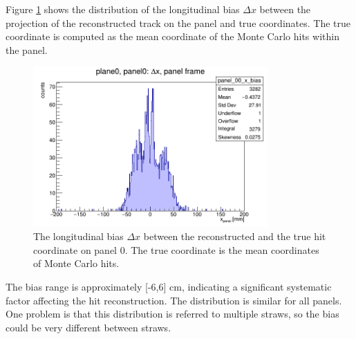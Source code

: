 Figure \ref{fig:bias} shows the distribution of the longitudinal bias $\Delta x$ between the projection 
of the reconstructed track on the panel and true coordinates. 
The true coordinate is computed as the mean coordinate of the Monte Carlo hits within the panel.
\begin{figure}[!h]
    \centering
    \includegraphics[width=0.8\textwidth]{figures/png/panel_00_x_bias.png}
    \caption[The bias between the reconstructed and the true hit coordinate.]{The longitudinal bias 
    $\Delta x$ between the reconstructed and the true hit coordinate on panel 0. 
    The true coordinate is the mean coordinates of Monte Carlo hits.}
    \label{fig:bias}
\end{figure}
The bias range is approximately [-6,6] cm, indicating a significant systematic factor 
affecting the hit reconstruction. The distribution is similar for all panels. 
One problem is that this distribution is referred to multiple straws, so the 
bias could be very different between straws.

